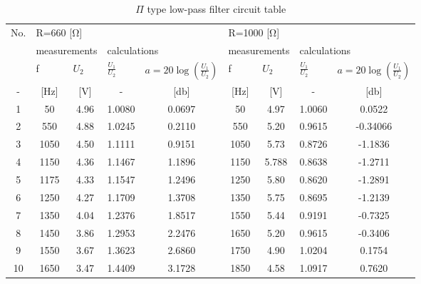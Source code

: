 \begin{table}[hptb]
        \centering
	\caption{$\Pi$ type low-pass filter circuit table}
	\label{tab:tab1}
        \begin{tabular}{|c|c|c|c|c|c|c|c|c|}
        \hline
        \multirow{3}{*}{No.} & 
        \multicolumn{4}{l|}{R=660 [\unit{\ohm}]} & 
        \multicolumn{4}{l|}{R=1000 [\unit{\ohm}]} \\
        \cline{2-9} & 
        \multicolumn{2}{l|}{measurements} & 
        \multicolumn{2}{l|}{calculations} & 
        \multicolumn{2}{l|}{measurements} & 
        \multicolumn{2}{l|}{calculations} \\ 
        \cline{2-9} & 
        \multicolumn{1}{l|}{f} &
        \multicolumn{1}{l|}{$U_2$} & 
        \multicolumn{1}{l|}{$\frac{U_1}{U_2}$} &
        \multicolumn{1}{l|}{$a=20\log(\frac{U_1}{U_2})$}& 
        \multicolumn{1}{l|}{f} & 
        \multicolumn{1}{l|}{$U_2$} & 
        \multicolumn{1}{l|}{$\frac{U_1}{U_2}$} & 
        \multicolumn{1}{l|}{$a=20\log(\frac{U_1}{U_2})$}\\ 
        \hline
        - & [\unit{\hertz}] & [\unit{\volt}] & - & [\unit{\decibel}] & [\unit{\hertz}] & [\unit{\volt}] & - & [\unit{\decibel}] \\
		\hline
        1 & 50 & 4.96 & 1.0080 & 0.0697 & 50 & 4.97 & 1.0060 & 0.0522 \\
        \hline
        2 & 550 & 4.88 & 1.0245 & 0.2110 & 550 & 5.20 & 0.9615 & -0.34066 \\
        \hline
        3 & 1050 & 4.50 & 1.1111 & 0.9151 & 1050 & 5.73 & 0.8726 & -1.1836 \\
        \hline
        4 & 1150 & 4.36 & 1.1467 & 1.1896 & 1150 & 5.788 & 0.8638 & -1.2711 \\
        \hline
        5 & 1175 & 4.33 & 1.1547 & 1.2496 & 1250 & 5.80 & 0.8620 & -1.2891 \\
        \hline
        6 & 1250 & 4.27 & 1.1709 & 1.3708 & 1350 & 5.75 & 0.8695 & -1.2139 \\
        \hline
        7 & 1350 & 4.04 & 1.2376 & 1.8517 & 1550 & 5.44 & 0.9191 & -0.7325 \\
        \hline
        8 & 1450 & 3.86 & 1.2953 & 2.2476 & 1650 & 5.20 & 0.9615 & -0.3406 \\
        \hline
        9 & 1550 & 3.67 & 1.3623 & 2.6860 & 1750 & 4.90 & 1.0204 & 0.1754 \\
        \hline
        10 & 1650 & 3.47 & 1.4409 & 3.1728 & 1850 & 4.58 & 1.0917 & 0.7620 \\
        \hline

\end{tabular}
\end{table}
